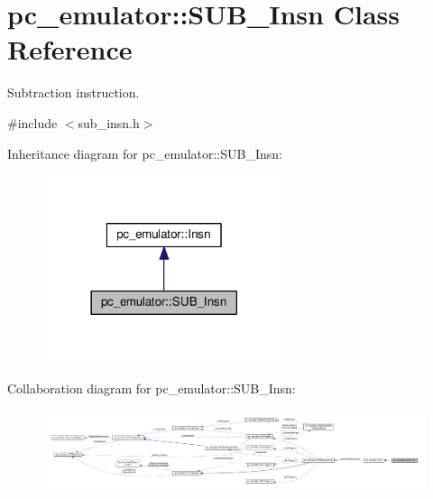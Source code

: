 \hypertarget{classpc__emulator_1_1SUB__Insn}{}\section{pc\+\_\+emulator\+:\+:S\+U\+B\+\_\+\+Insn Class Reference}
\label{classpc__emulator_1_1SUB__Insn}


Subtraction instruction.  




{\ttfamily \#include $<$sub\+\_\+insn.\+h$>$}



Inheritance diagram for pc\+\_\+emulator\+:\+:S\+U\+B\+\_\+\+Insn\+:\nopagebreak
\begin{figure}[H]
\begin{center}
\leavevmode
\includegraphics[width=201pt]{classpc__emulator_1_1SUB__Insn__inherit__graph}
\end{center}
\end{figure}


Collaboration diagram for pc\+\_\+emulator\+:\+:S\+U\+B\+\_\+\+Insn\+:\nopagebreak
\begin{figure}[H]
\begin{center}
\leavevmode
\includegraphics[width=350pt]{classpc__emulator_1_1SUB__Insn__coll__graph}
\end{center}
\end{figure}
